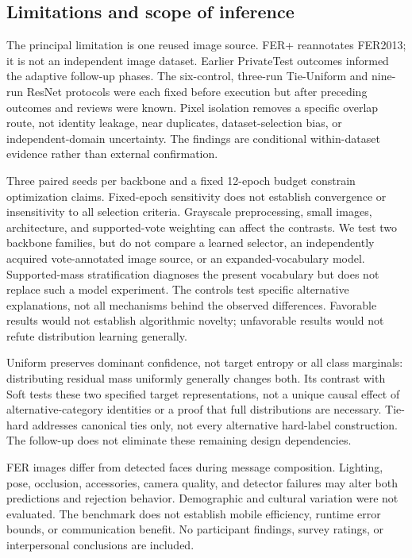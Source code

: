 \documentclass[pdflatex,sn-mathphys-num]{sn-jnl}
\begin{document}
\subsection{Limitations and scope of inference}
The principal limitation is one reused image source. FER+ reannotates FER2013; it is not an independent image dataset. Earlier PrivateTest outcomes informed the adaptive follow-up phases. The six-control, three-run Tie-Uniform and nine-run ResNet protocols were each fixed before execution but after preceding outcomes and reviews were known. Pixel isolation removes a specific overlap route, not identity leakage, near duplicates, dataset-selection bias, or independent-domain uncertainty. The findings are conditional within-dataset evidence rather than external confirmation.

Three paired seeds per backbone and a fixed 12-epoch budget constrain optimization claims. Fixed-epoch sensitivity does not establish convergence or insensitivity to all selection criteria. Grayscale preprocessing, small images, architecture, and supported-vote weighting can affect the contrasts. We test two backbone families, but do not compare a learned selector, an independently acquired vote-annotated image source, or an expanded-vocabulary model. Supported-mass stratification diagnoses the present vocabulary but does not replace such a model experiment. The controls test specific alternative explanations, not all mechanisms behind the observed differences. Favorable results would not establish algorithmic novelty; unfavorable results would not refute distribution learning generally.

Uniform preserves dominant confidence, not target entropy or all class marginals: distributing residual mass uniformly generally changes both. Its contrast with Soft tests these two specified target representations, not a unique causal effect of alternative-category identities or a proof that full distributions are necessary. Tie-hard addresses canonical ties only, not every alternative hard-label construction. The follow-up does not eliminate these remaining design dependencies.

FER images differ from detected faces during message composition. Lighting, pose, occlusion, accessories, camera quality, and detector failures may alter both predictions and rejection behavior. Demographic and cultural variation were not evaluated. The benchmark does not establish mobile efficiency, runtime error bounds, or communication benefit. No participant findings, survey ratings, or interpersonal conclusions are included.
\end{document}
